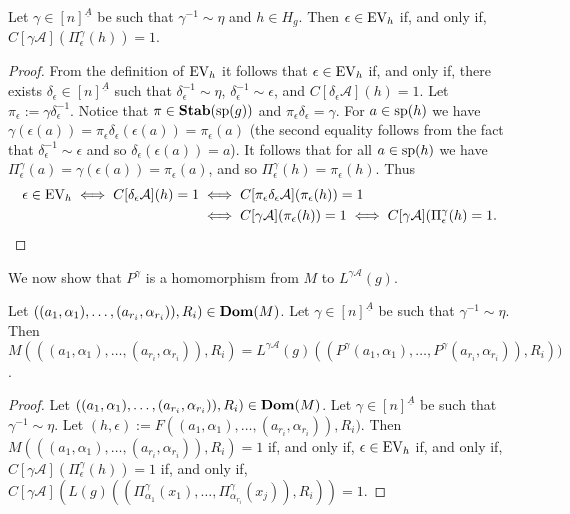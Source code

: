 \documentclass[../main/thesis.tex]{subfiles}
\begin{document}
\begin{lem}
	Let $\gamma\in [n]^{\underline{A}}$ be such that $\gamma^{-1} \sim \eta$ and
  $h \in H_g$. Then $\epsilon \in \text{EV}_h$ if, and only if, $C[\gamma
  \mathcal{A}](\Pi^{\gamma}_{\epsilon} (h)) = 1$.
  \label{lem:translate-EV-circuits}
\end{lem}
\begin{proof}
  From the definition of $\text{EV}_h$ it follows that $\epsilon \in \text{EV}_h$ if, and
  only if, there exists $\delta_{\epsilon} \in [n]^{\underline{A}}$ such that
  $\delta^{-1}_{\epsilon} \sim \eta$, $\delta^{-1}_{\epsilon} \sim \epsilon$,
  and $C[\delta_{\epsilon} \mathcal{A}](h) = 1$. Let $\pi_{\epsilon} := \gamma
  \delta^{-1}_{\epsilon}$. Notice that $\pi \in \text{\textbf{Stab}} (\text{sp} (g))$ and $\pi_{\epsilon}
  \delta_{\epsilon} = \gamma$. For $a \in \text{sp}(h)$ we have $\gamma
  (\epsilon(a)) = \pi_{\epsilon} \delta_{\epsilon} (\epsilon (a)) =
  \pi_{\epsilon}(a)$ (the second equality follows from the fact that
  $\delta^{-1}_{\epsilon} \sim \epsilon$ and so $\delta_{\epsilon} (\epsilon
  (a)) = a$). It follows that for all $a \in \text{sp}(h)$ we have
  $\Pi^{\gamma}_\epsilon (a) = \gamma (\epsilon (a)) = \pi_{\epsilon}(a)$, and
  so $\Pi^{\gamma}_{\epsilon}(h) = \pi_{\epsilon}(h)$. Thus
  \begin{align*}
    \epsilon \in \text{EV}_h \iff C[\delta_{\epsilon} \mathcal{A}](h) = 1 
    & \iff C[\pi_\epsilon \delta_{\epsilon} \mathcal{A}](\pi_{\epsilon} (h)) = 1 \\
    & \iff C[\gamma \mathcal{A}](\pi_{\epsilon} (h)) = 1 
      \iff C[\gamma \mathcal{A}](\Pi^{\gamma}_{\epsilon}(h) = 1.
  \end{align*}
\end{proof}

We now show that $P^{\gamma}$ is a homomorphism from $M$ to $L^{\gamma
  \mathcal{A}}(g)$.

\begin{prop}
  Let $((a_1, \alpha_1), \ldots, (a_{r_i}, \alpha_{r_i})), R_i) \in \text{\textbf{Dom}} (M)$.
  Let $\gamma \in [n]^{\underline{A}}$ be such that $ \gamma^{-1} \sim \eta$.
  Then $M(((a_1, \alpha_1), \ldots, (a_{r_i}, \alpha_{r_i})), R_i) =
  L^{\gamma\mathcal{A}}(g)((P^{\gamma}(a_1, \alpha_1), \ldots,
  P^{\gamma}(a_{r_i}, \alpha_{r_i})), R_i))$.
	\label{prop:M-to-L-homomorphism}
\end{prop}
\begin{proof}
  Let $((a_1, \alpha_1), \ldots, (a_{r_i}, \alpha_{r_i})), R_i) \in \text{\textbf{Dom}} (M)$.
  Let $\gamma \in [n]^{\underline{A}}$ be such that $ \gamma^{-1} \sim \eta$.
  Let $(h, \epsilon) := F((a_1, \alpha_1), \ldots, (a_{r_i}, \alpha_{r_i})),
  R_i)$. Then $M(((a_1, \alpha_1), \ldots, (a_{r_i}, \alpha_{r_i})), R_i) = 1$
  if, and only if, $\epsilon \in \text{EV}_h$ if, and only if, $C[\gamma \mathcal{A}]
  (\Pi^{\gamma}_{\epsilon}(h)) = 1$ if, and only if, $C[\gamma \mathcal{A}]
  (L(g)((\Pi^{\gamma}_{\alpha_1} (x_1), \ldots,
  \Pi^{\gamma}_{\alpha_{r_i}}(x_j)), R_i)) = 1$.
\end{proof}
\end{document}
